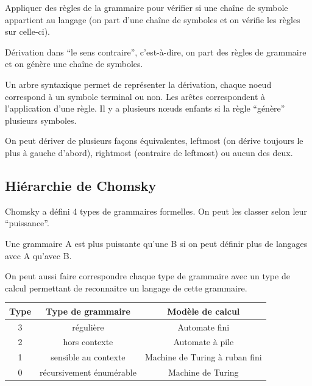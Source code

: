 \begin{mydef}[Dériver] Appliquer des règles de la grammaire pour vérifier
	si une chaîne de symbole appartient au langage (on part d'une chaîne de symboles
	et on vérifie les règles sur celle-ci).
\end{mydef}

\begin{mydef}[Inférer] Dérivation dans ``le sens contraire'',
	c'est-à-dire, on part des règles de grammaire et on génère une chaîne
	de symboles.
\end{mydef}

\begin{mydef}
	Un arbre syntaxique permet de représenter la dérivation, chaque noeud
	correspond à un symbole terminal ou non. Les arêtes correspondent à
	l'application d'une règle. Il y a plusieurs nœuds enfants si la règle
	``génère'' plusieurs symboles.
\end{mydef}

\begin{myprop}
	On peut dériver de plusieurs façons équivalentes, leftmost (on dérive
	toujours le plus à gauche d'abord), rightmost (contraire de leftmost)
	ou  aucun des deux.
\end{myprop}

\subsection{Hiérarchie de Chomsky}
\label{ssub:hi_rarchie_de_chomsky}

Chomsky a défini 4 types de grammaires formelles. On peut les classer selon
leur ``puissance''.

\begin{mydef}
	Une grammaire A est plus puissante qu'une B si on peut définir plus
	de langages avec A qu'avec B.
\end{mydef}

On peut aussi faire correspondre chaque type de grammaire avec un type de
calcul permettant de reconnaitre un langage de cette grammaire.

\begin{tabular}{|c|c|c|}
	\hline
	 Type & Type de grammaire & Modèle de calcul\\
	 \hline
	3 & régulière & Automate fini \\
	 \hline
	2 & hors contexte & Automate à pile \\
	 \hline
	1 & sensible au contexte & Machine de Turing à ruban fini \\
	 \hline
	0 & récursivement énumérable & Machine de Turing \\
	\hline
\end{tabular}

